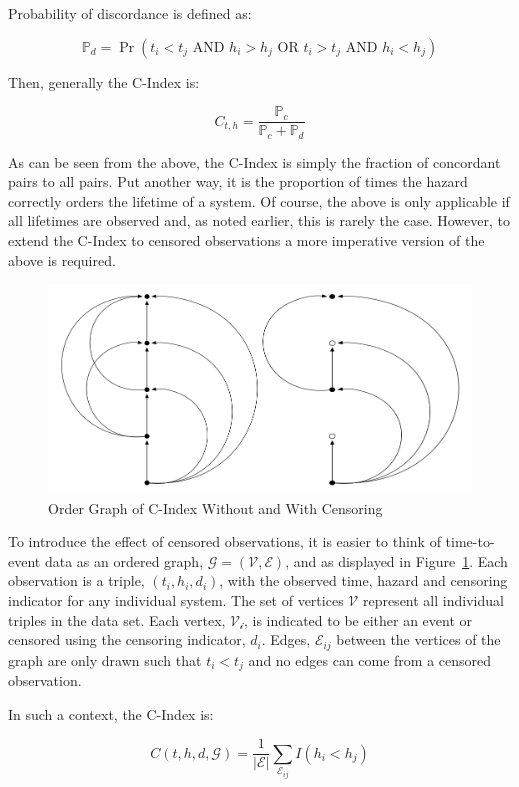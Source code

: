 Probability of discordance is defined as:

$$\mathbb{P}_d  = \Pr(t_i  < t_j \text{ AND } h_i > h_j \text{ OR } t_i  > t_j \text{ AND } h_i < h_j)  $$

Then, generally the C-Index is:

$$ C_{t, h} = \frac{\mathbb{P}_c}{\mathbb{P}_c + \mathbb{P}_d} $$

As can be seen from the above, the C-Index is simply the fraction of concordant pairs to all pairs. Put another way, it is the proportion of times the hazard correctly orders the lifetime of a system. Of course, the above is only applicable if all lifetimes are observed and, as noted earlier, this is rarely the case. However, to extend the C-Index to censored observations a more imperative version of the above is required. 

\begin{figure}[ht!]
    \centering
    \includegraphics[width=350pt]{img/c_index_graph}
    \caption{Order Graph of C-Index Without and With Censoring}
    \label{ci_graph}
\end{figure}


To introduce the effect of censored observations, it is easier to think of time-to-event data as an ordered graph, $\mathcal{G} = (\mathcal{V}, \mathcal{E})$, and as displayed in Figure~\ref{ci_graph}\cite{Steck2008}. Each observation is a triple, $(t_i, h_i, d_i)$, with the observed time, hazard and censoring indicator for any individual system. The set of vertices $\mathcal{V}$ represent all individual triples in the data set. Each vertex, $\mathcal{V_i}$, is indicated to be either an event or censored using the censoring indicator, $d_i$. Edges, $\mathcal{E}_{ij}$ between the vertices of the graph are only drawn such that $t_i < t_j$ and no edges can come from a censored observation.

In such a context, the C-Index is:

$$ C(t, h, d, \mathcal{G}) = \frac{1}{\mathcal{|E|}} \sum_{\mathcal{E}_{ij}} I(h_i < h_j) $$


